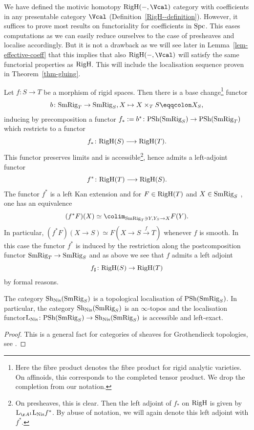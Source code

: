 \documentclass[colorinlistoftodos,article,11pt,reqno]{article}
\newcommand{\RigH}{\textup{RigH}}
\newcommand{\SmRig}{\textup{SmRig}}
\newcommand{\Spc}{\textup{Spc}}
\newcommand{\PSh}{\textup{PSh}}
\newcommand{\Sh}{\textup{Sh}}
\newcommand{\Nis}{\textup{Nis}}
\newcommand{\Arig}{\AA^{1}}
\renewcommand{\to}[1][]{\overset{#1}{\rightarrow}}
\newcommand{\To}[1][]{\overset{#1}{\longrightarrow}}
\renewcommand{\L}{\textup{L}}
\begin{document}
We have defined the motivic homotopy $\RigH(-,\Vcal)$ category with coefficients in any presentable category $\Vcal$ (Definition~\ref{RigH--definition}). However, it suffices to prove most results on functoriality for coefficients in $\Spc$.
This eases computations as we can easily reduce ourselves to the case of presheaves and localise accordingly. But it is not a drawback as we will see later in Lemma~\ref{lem-effective-coeff} that this implies that also $\RigH(-,\Vcal)$ will satisfy the same functorial properties as $\RigH$. This will include the localisation sequence proven in Theorem~\ref{thm-gluing}. 


Let $f\colon S\to T$ be a morphism of rigid spaces. Then there is a base change\footnote{Here the fibre product denotes the fibre product for rigid analytic varieties. On affinoids, this corresponds to the completed tensor product. We drop the completion from our notation.} functor 
\[ b \colon \SmRig_T\to\SmRig_S, X\mapsto X\times_TS\eqqcolon X_{S},\]
inducing by precomposition a functor $f_* := b^* \colon \PSh(\SmRig_S) \to \PSh(\SmRig_T)$ which restricts to a functor 
\[ f_* \colon \RigH(S) \To \RigH(T). \]
This functor preserves limits and is accessible\footnote{On presheaves, this is clear. Then the left adjoint of $f_{*}$ on $\RigH$ is given by $\L_{\Arig}\L_{\Nis}f^{*}$. By abuse of notation, we will again denote this left adjoint with $f^{*}$.}, hence admits a left-adjoint functor
\[ f^* \colon \RigH(T) \To \RigH(S). \]
The functor $f^*$ is a left Kan extension and for $F\in\RigH(T)$ and $X\in\SmRig_{S}$ \cite[Prop. 4.3.3.7]{HTT}, one has an equivalence
\[ (f^*F)(X) \simeq \colim_{\SmRig_T\ni Y, Y_{S}\to X}F(Y). \]
In particular, $(f^*F)(X\to S) \simeq F(X\to S\to[f] T)$ whenever $f$ is smooth. In this case the functor $f^{*}$ is induced by the restriction along the postcomposition functor $\SmRig_{T}\to \SmRig_{S}$ and as above we see that $f$ admits a left adjoint
\[ f_{\sharp}\colon \RigH(S)\to \RigH(T) \]
by formal reasons.

\begin{lemma}
\label{lem.Nis-localisation}
The category $\Sh_\Nis(\SmRig_S)$ is a topological localisation of $\PSh(\SmRig_S)$. In particular, the category $\Sh_\Nis(\SmRig_S)$ is an $\infty$-topos and the localisation functor\linebreak $\L_\Nis \colon \PSh(\SmRig_S) \to \Sh_\Nis(\SmRig_S)$ is accessible and left-exact.
\end{lemma}
\begin{proof}
This is a general fact for categories of sheaves for Grothendieck topologies, see \cite[6.2.2.7, 6.2.1.7]{HTT}.
\end{proof}
\end{document}
